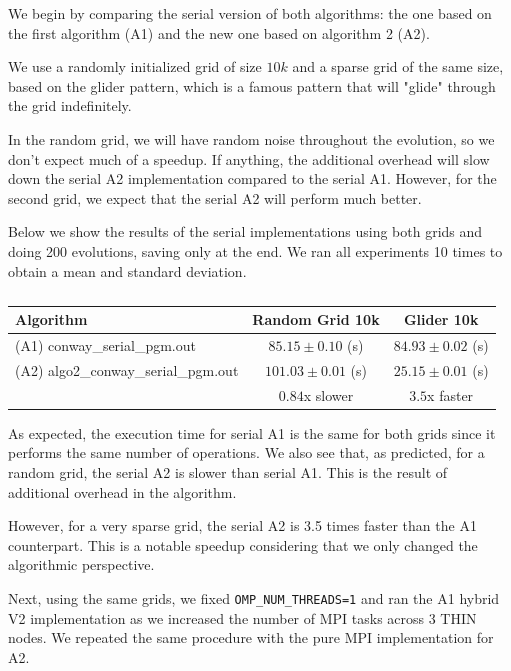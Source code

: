 \documentclass{report}
\begin{document}
We begin by comparing the serial version of both algorithms: the one based on 
the first algorithm (A1) and the new one based on algorithm 2 (A2). 

We use a randomly initialized grid of size $10k$ and a sparse grid of the same 
size, based on the glider pattern\cite{glider}, which is a famous pattern that 
will "glide" through the grid indefinitely. 

In the random grid, we will have random noise throughout the evolution, so we 
don't expect much of a speedup. If anything, the additional overhead will slow 
down the serial A2 implementation compared to the serial A1. However, for the 
second grid, we expect that the serial A2 will perform much better. 

Below we show the results of the serial implementations using both grids and doing 
200 evolutions, saving only at the end. We ran all experiments 10 times to 
obtain a mean and standard deviation.

\begin{table}[H]
\centering
\begin{tabular}{|l|c|c|}
    \hline
    Algorithm                      &   Random Grid 10k       & Glider 10k             \\ \hline
    (A1) conway\_serial\_pgm.out        &   $85.15 \pm 0.10$ (s)  & $84.93 \pm 0.02$ (s)   \\
    (A2) algo2\_conway\_serial\_pgm.out &   $101.03 \pm 0.01$ (s) & $25.15 \pm 0.01$ (s)   \\ \hline
                                   &   $0.84$x slower        & $ 3.5$x faster         \\ \hline
\end{tabular}
\caption{\label{tab:a2serial}}
\end{table}

As expected, the execution time for serial A1 is the same for both grids since 
it performs the same number of operations. We also see that, as predicted, 
for a random grid, the serial A2 is slower than serial A1. This is the result 
of additional overhead in the algorithm. 

However, for a very sparse grid, the serial A2 is 
3.5 times faster than the A1 counterpart. This is a notable speedup 
considering that we only changed the algorithmic perspective. 

Next, using the same grids, we fixed \texttt{OMP\_NUM\_THREADS=1} and ran the 
A1 hybrid V2 implementation as we increased the number of MPI tasks across 3 THIN 
nodes. We repeated the same procedure with the pure MPI implementation for 
A2.
\end{document}
